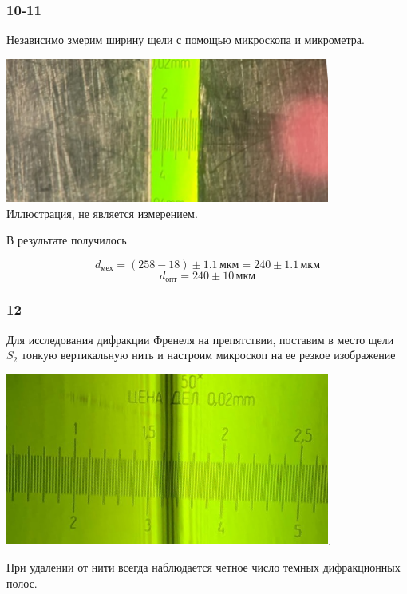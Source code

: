 \subsubsection*{10-11}

Независимо змерим ширину щели с помощью микроскопа и микрометра.

\begin{center}
\includegraphics[width=0.80\textwidth]{5.png}\\
Иллюстрация, не является измерением.
\end{center}

В результате получилось

\[d_{\text{мех}}=(258-18)\pm1.1\,\text{мкм}=240\pm1.1\,\text{мкм}\]
\[d_{\text{опт}}=240\pm10\,\text{мкм}\]

\subsubsection*{12}

Для исследования дифракции Френеля на препятствии, поставим в место щели $S_2$ тонкую вертикальную нить и настроим микроскоп на ее резкое изображение

\begin{center}
\includegraphics[width=0.80\textwidth]{6.png}.\\
\end{center}

При удалении от нити всегда наблюдается четное число темных дифракционных полос.

